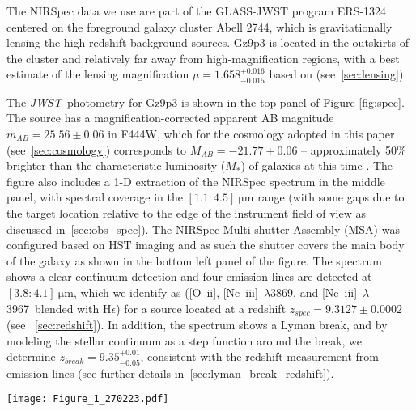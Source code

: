 \documentclass[sn-mathphys]{sn-jnl}%
\theoremstyle{thmstyleone}%
\theoremstyle{thmstyletwo}%
\theoremstyle{thmstylethree}%
\newcommand{\Oii}{[O~{\sc ii}]}
\newcommand{\Neiiia}{[Ne~{\sc iii}]~$\lambda$3869}
\newcommand{\Neiiib}{[Ne~{\sc iii}]~$\lambda$3967}
\newcommand{\He}{H$\epsilon$}
\newcommand{\jwst}{\textit{JWST}}
\begin{document}
The NIRSpec data we use are part of the GLASS-JWST program ERS-1324 \citep{TreuGlass22} centered on the foreground galaxy cluster Abell 2744, which is gravitationally lensing the high-redshift background sources. Gz9p3 is located in the outskirts of the cluster and relatively far away from high-magnification regions, with a best estimate of the lensing magnification $\mu=1.658^{+0.016}_{-0.015}$ based on \cite{Bergamini2022} (see~\ref{sec:lensing}). 

The \jwst\ photometry for Gz9p3 is shown in the top panel of Figure \ref{fig:spec}. The source has a magnification-corrected apparent AB magnitude  $m_{AB}=25.56\pm0.06$ in F444W, which for the cosmology adopted in this paper (see~\ref{sec:cosmology}) corresponds to $M_{AB}=-21.77\pm0.06$ -- approximately 50\% brighter than the characteristic luminosity ($M_*$) of galaxies at this time \citep{Bouwens21}. The figure also includes a 1-D extraction of the NIRSpec spectrum in the middle panel, with spectral coverage in the $[1.1:4.5]~\mathrm{\mu m}$ range (with some gaps due to the target location relative to the edge of the instrument field of view as discussed in~\ref{sec:obs_spec}). The NIRSpec Multi-shutter Assembly (MSA) was configured based on HST imaging and as such the shutter covers the main body of the galaxy as shown in the bottom left panel of the figure. The spectrum shows a clear continuum detection and four emission lines are detected at $[3.8:4.1]~\mathrm{\mu m}$, which we identify as (\Oii, \Neiiia, and \Neiiib\ blended with \He) for a source located at a redshift $z_{spec}=9.3127\pm0.0002$ (see ~\ref{sec:redshift}). In addition, the spectrum shows a Lyman break, and by modeling the stellar continuum as a step function around the break, we determine $z_{break} =9.35_{-0.05}^{+0.01}$, consistent with the redshift measurement from emission lines (see further details in~\ref{sec:lyman_break_redshift}). 

\begin{figure*}
    \centering
    \texttt{[image: Figure\_1\_270223.pdf]}
    \caption{\jwst\ NIRCam and NIRSpec observations of Galaxy GLASS ID:Gz9p3. Top row: NIRCam direct imaging in broad-band filters. Second row: 1D standard extracted spectrum with $f_\lambda = 10^{-19} $erg s$^{-1} $cm$^{-2}$ \AA$^{-1}$ (with Npix=20 binning) from NIRSpec f100lp/g170h, f170lp/g235h $\&$ f290lp/g395h filter-dispersor configurations (from left-to-right in blue, orange and green). The observed frame location of the Lyman-break ($\lambda_{\rm rest}=1215.67$) and the \Oii, \Neiiia\ $\&$ \Neiiib+\He\ emission lines are overlaid as vertical dashed red lines for a $z_{\rm spec}=9.313$.  Solid grey masked regions show the location of contaminating emission lines from an adjacent spectrum. Bottom left panel shows the color composite from NIRCam with NIRSpec slit positioning overlayed. The other three bottom panels are zoom in on a $\pm400$\AA\ region centered on each emission line complexes (\Oii, \Neiiia, \Neiiib+\He) with the continuum subtracted and the best-fit profile overlaid ($f_\lambda = 10^{-19}$ erg s$^{-1}$ cm$^{-2}$ \AA$^{-1}$).}
    \label{fig:spec}
\end{figure*}
\end{document}
